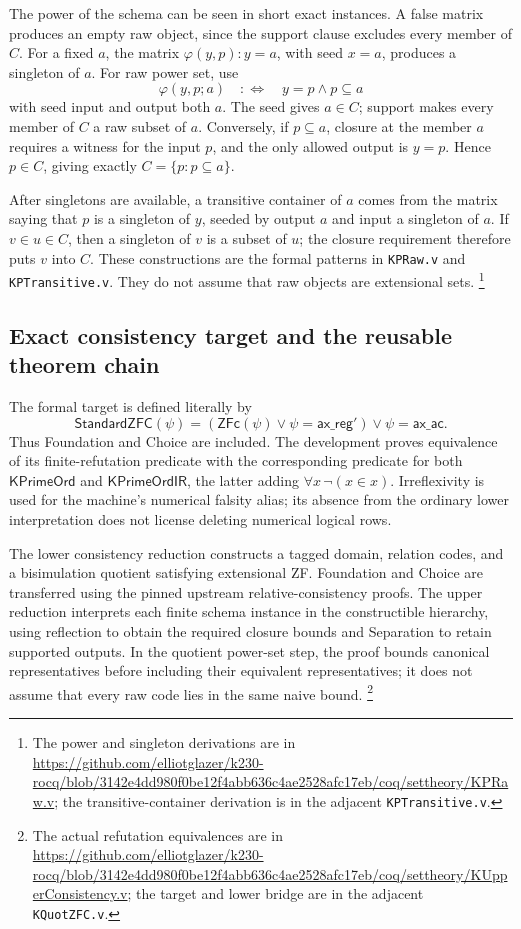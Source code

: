 The power of the schema can be seen in short exact instances.  A false
matrix produces an empty raw object, since the support clause excludes
every member of $C$.  For a fixed $a$, the matrix $\varphi(y,p):y=a$,
with seed $x=a$, produces a singleton of $a$.  For raw power set, use
\[
                 \varphi(y,p;a)\quad:\!\!\Longleftrightarrow\quad
                    y=p\land p\subseteq a
\]
with seed input and output both $a$.  The seed gives $a\in C$;
support makes every member of $C$ a raw subset of $a$.  Conversely,
if $p\subseteq a$, closure at the member $a$ requires a witness for
the input $p$, and the only allowed output is $y=p$.  Hence
$p\in C$, giving exactly $C=\{p:p\subseteq a\}$.

After singletons are available, a transitive container of $a$ comes
from the matrix saying that $p$ is a singleton of $y$, seeded by
output $a$ and input a singleton of $a$.  If $v\in u\in C$,
then a singleton of $v$ is a subset of $u$; the closure requirement
therefore puts $v$ into $C$.  These constructions are the formal
patterns in \texttt{KPRaw.v} and \texttt{KPTransitive.v}.
They do not assume that raw objects are extensional sets.
\footnote{The power and singleton derivations are in
\url{https://github.com/elliotglazer/k230-rocq/blob/3142e4dd980f0be12f4abb636c4ae2528afc17eb/coq/settheory/KPRaw.v};
the transitive-container derivation is in the adjacent
\texttt{KPTransitive.v}.}

\subsection{Exact consistency target and the reusable theorem chain}

The formal target is defined literally by
\[
 \mathsf{StandardZFC}(\psi)=
       (\mathsf{ZFc}(\psi)\lor\psi=\mathsf{ax\_reg}')
                       \lor\psi=\mathsf{ax\_ac}.
\]
Thus Foundation and Choice are included.  The development proves
equivalence of its finite-refutation predicate with the corresponding
predicate for both $\mathsf{KPrimeOrd}$ and
$\mathsf{KPrimeOrdIR}$, the latter adding
$\forall x\,\neg(x\in x)$.
Irreflexivity is used for the machine's numerical falsity alias;
its absence from the ordinary lower interpretation does not license
deleting numerical logical rows.

The lower consistency reduction constructs a tagged domain, relation
codes, and a bisimulation quotient satisfying extensional ZF.  Foundation
and Choice are transferred using the pinned upstream relative-consistency
proofs.  The upper reduction interprets each finite schema instance in
the constructible hierarchy, using reflection to obtain the required
closure bounds and Separation to retain supported outputs.
In the quotient power-set step, the proof bounds canonical representatives
before including their equivalent representatives; it does not assume
that every raw code lies in the same naive bound.
\footnote{The actual refutation equivalences are in
\url{https://github.com/elliotglazer/k230-rocq/blob/3142e4dd980f0be12f4abb636c4ae2528afc17eb/coq/settheory/KUpperConsistency.v};
the target and lower bridge are in the adjacent \texttt{KQuotZFC.v}.}

